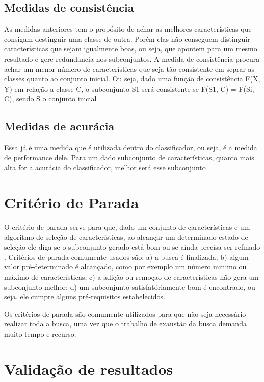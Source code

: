 \subsection{Medidas de consistência}

As medidas anteriores tem o propósito de achar as melhores características que consigam destinguir uma classe de outra. Porém elas não conseguem distinguir características que sejam igualmente boas, ou seja, que apontem para um mesmo resultado e gere redundancia nos subconjuntos. A medida de consistência procura achar um menor número de características que seja tão consistente em seprar as classes quanto ao conjunto inicial. Ou seja, dado uma função de consistência F(X, Y) em relação a classe C, o subconjunto S1 será consistente se F(S1, C) = F(Si, C), sendo S o conjunto inicial \cite{liu_2005}

\subsection{Medidas de acurácia}

Essa já é uma medida que é utilizada dentro do classificador, ou seja, é a medida de performance dele. Para um dado subconjunto de características, quanto mais alta for a acurácia do classificador, melhor será esse subconjunto \cite{huan_1998}.

\section{Critério de Parada}

O critério de parada serve para que, dado um conjunto de características e um algoritmo de seleção de características, ao alcançar um determinado estado de seleção ele diga se o subconjunto gerado está bom ou se ainda precisa ser refinado \cite{dash_1997}. Critérios de parada comumente usados são: a) a busca é finalizada; b) algum valor pré-determinado é alcançado, como por exemplo um número minimo ou máximo de características; c) a adição ou remoçao de características não gera um subconjunto melhor; d) um subconjunto satisfatóriamente bom é encontrado, ou seja, ele cumpre alguns pré-requisitos estabelecidos.

Os critérios de parada são comumente utilizados para que não seja necessário realizar toda a busca, uma vez que o trabalho de exaustão da busca demanda muito tempo e recurso.

\section{Validação de resultados}

